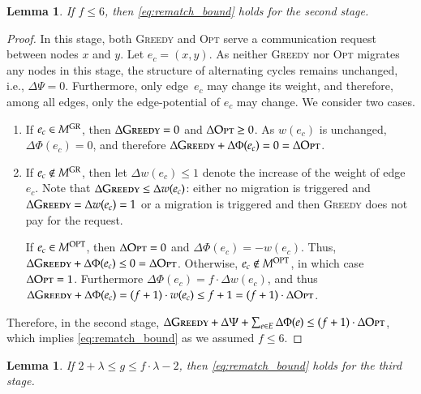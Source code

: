 \documentclass[11pt,a4paper]{scrartcl}
\newtheorem{lemma}[theorem]{Lemma}
\newcommand{\GREEDY}{\textsc{Greedy}\xspace}
\newcommand{\MGREEDY}{M^\textsc{GR}}
\newcommand{\MOPT}{M^\textsc{OPT}}
\newcommand{\OPT}{\textsc{Opt}\xspace}
\begin{document}
\begin{lemma}
\label{lem:rematch_req}
If $f \leq 6$, then \eqref{eq:rematch_bound} holds for the second stage.
\end{lemma}

\begin{proof}
In this stage, both \GREEDY and \OPT serve a communication request between
nodes $x$ and $y$. Let $e_c = (x,y)$. As neither \GREEDY nor \OPT migrates any
nodes in this stage, the structure of alternating cycles remains
unchanged, i.e., $\Delta \Psi = 0$. Furthermore, only edge~$e_c$ may change its
weight, and therefore, among all edges, only the edge-potential of $e_c$ may
change. We consider two cases.
\begin{enumerate}

\item If $e_c \in \MGREEDY$, then $\Delta \GREEDY = 0$ and $\Delta \OPT \geq 0$. As
$w(e_c)$ is unchanged, $\Delta \Phi(e_c) = 0$, and therefore 
$\Delta \GREEDY + \Delta \Phi(e_c) = 0 = \Delta \OPT$. 

\item If $e_c \notin \MGREEDY$, then let $\Delta w(e_c) \leq 1$ denote the increase 
of the weight of edge~$e_c$. Note that $\Delta \GREEDY \leq \Delta w(e_c)$: 
either no migration is triggered and $\Delta \GREEDY = \Delta w(e_c) = 1$
or a migration is triggered and then \GREEDY does not pay for the request.

If $e_c \in \MOPT$, then $\Delta \OPT = 0$ and $\Delta \Phi(e_c) = -w(e_c)$.
Thus, $\Delta \GREEDY + \Delta \Phi(e_c) \leq 0 = \Delta \OPT$. Otherwise, 
$e_c \notin \MOPT$, in which case 
$\Delta \OPT = 1$. Furthermore $\Delta \Phi(e_c) = f \cdot \Delta w(e_c)$,
and thus $\Delta \GREEDY + \Delta \Phi(e_c) = (f+1) \cdot w(e_c) \leq f+1 =
(f+1) \cdot \Delta \OPT$.
\end{enumerate}

Therefore, in the second stage, $\Delta \GREEDY + \Delta \Psi + \sum_{e \in E}
\Delta \Phi(e) \leq (f+1) \cdot \Delta \OPT$,
which implies \eqref{eq:rematch_bound} as we assumed $f \leq 6$.
\end{proof}


\begin{lemma}
\label{lem:greedy_swap}
If $2 + \lambda \leq g \leq f \cdot \lambda - 2$, 
then  \eqref{eq:rematch_bound} holds for the third stage.
\end{lemma}
\end{document}
